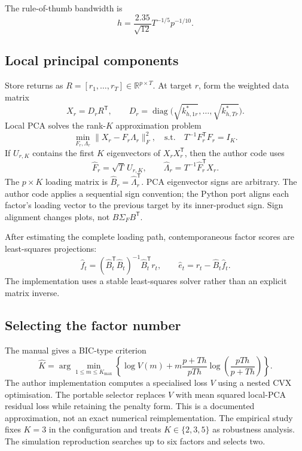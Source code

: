 \documentclass[11pt,a4paper]{article}
\newcommand{\R}{\mathbb{R}}
\newcommand{\wh}{\widehat}
\newcommand{\trans}{^{\mathsf T}}
\begin{document}
The rule-of-thumb bandwidth is
\begin{equation}
 h=\frac{2.35}{\sqrt{12}}T^{-1/5}p^{-1/10}.
 \label{eq:bandwidth}
\end{equation}

\subsection{Local principal components}

Store returns as $R=[r_1,\ldots,r_T]\in\R^{p\times T}$. At target $r$, form the weighted data matrix
\begin{equation}
 X_r=D_rR\trans,
 \qquad D_r=\operatorname{diag}\big(\sqrt{k^*_{h,1r}},\ldots,\sqrt{k^*_{h,Tr}}\big).
\end{equation}
Local PCA solves the rank-$K$ approximation problem
\begin{equation}
 \min_{F_r,\Lambda_r}\|X_r-F_r\Lambda_r\|_F^2,
 \quad \text{s.t.}\quad T^{-1}F_r\trans F_r=I_K.
\end{equation}
If $U_{r,K}$ contains the first $K$ eigenvectors of $X_rX_r\trans$, then the author code uses
\begin{equation}
 \wh F_r=\sqrt{T}\,U_{r,K},
 \qquad
 \wh\Lambda_r=T^{-1}\wh F_r\trans X_r.
 \label{eq:local-pca}
\end{equation}
The $p\times K$ loading matrix is $\wh B_r=\wh\Lambda_r\trans$. PCA eigenvector signs are arbitrary. The author code applies a sequential sign convention; the Python port aligns each factor's loading vector to the previous target by its inner-product sign. Sign alignment changes plots, not $B\Sigma_FB\trans$.

After estimating the complete loading path, contemporaneous factor scores are least-squares projections:
\begin{equation}
 \wh f_t=(\wh B_t\trans\wh B_t)^{-1}\wh B_t\trans r_t,
 \qquad
 \wh e_t=r_t-\wh B_t\wh f_t.
 \label{eq:scores-residuals}
\end{equation}
The implementation uses a stable least-squares solver rather than an explicit matrix inverse.

\subsection{Selecting the factor number}

The manual gives a BIC-type criterion
\begin{equation}
 \wh K=\arg\min_{1\le m\le K_{\max}}
 \left\{
 \log V(m)+m\frac{p+Th}{pTh}\log\!\left(\frac{pTh}{p+Th}\right)
 \right\}.
 \label{eq:factor-ic}
\end{equation}
The author implementation computes a specialised loss $V$ using a nested CVX optimisation. The portable selector replaces $V$ with mean squared local-PCA residual loss while retaining the penalty form. This is a documented approximation, not an exact numerical reimplementation. The empirical study fixes $K=3$ in the configuration and treats $K\in\{2,3,5\}$ as robustness analysis. The simulation reproduction searches up to six factors and selects two.
\end{document}
